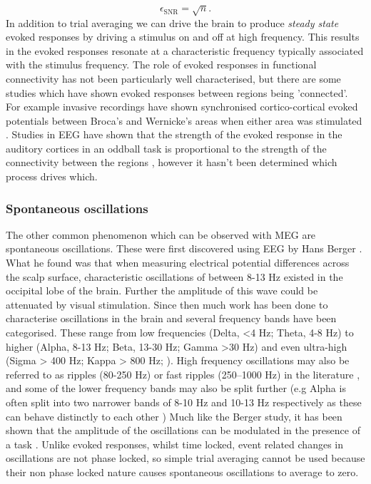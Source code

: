 \begin{equation}
\epsilon_\text{SNR} = \sqrt{n}.
\end{equation} In addition to trial averaging we can drive the brain to produce \textit{steady state} evoked responses \citep{Regan1977} by driving a stimulus on and off at high frequency. This results in the evoked responses resonate at a characteristic frequency typically associated with the stimulus frequency. The role of evoked responses in functional connectivity has not been particularly well characterised, but there are some studies which have shown evoked responses between regions being 'connected'. For example invasive recordings have shown synchronised cortico-cortical evoked potentials between Broca's and Wernicke's areas when either area was stimulated \citep{Matsumoto2004}. Studies in EEG have shown that the strength of the evoked response in the auditory cortices in an oddball task is proportional to the strength of the connectivity between the regions \citep{Kuhnis2014}, however it hasn't been determined which process drives which.  

\subsubsection{Spontaneous oscillations} 
The other common phenomenon which can be observed with MEG are spontaneous oscillations. These were first discovered using EEG by Hans Berger \citeyearpar{Berger1929}. What he found was that when measuring electrical potential differences across the scalp surface, characteristic oscillations of between 8-13 Hz existed in the occipital lobe of the brain. Further the amplitude of this wave could be attenuated by visual stimulation. Since then much work has been done to characterise oscillations in the brain and several frequency bands have been categorised. These range from low frequencies (Delta, <4 Hz; Theta, 4-8 Hz) to higher (Alpha, 8-13 Hz; Beta, 13-30 Hz; Gamma >30 Hz) and even ultra-high (Sigma > 400 Hz; Kappa > 800 Hz; \citealp{Fedele2015}). High frequency oscillations may also be referred to as ripples (80-250 Hz) or fast ripples (250–1000 Hz) in the literature \citep{Buzsaki1992,Bragin2002,Worrell2008}, and some of the lower frequency bands may also be split further (e.g Alpha is often split into two narrower bands of 8-10 Hz and 10-13 Hz respectively as these can behave distinctly to each other \citep{Bosboom2008,vanderMeer2013,Hillebrand2016}) Much like the Berger study, it has been shown that the amplitude of the oscillations can be modulated in the presence of a task \citep{Pfurtscheller1999,vanBurik1999,Singh2002}. Unlike evoked responses, whilst time locked, event related changes in oscillations are not phase locked, so simple trial averaging cannot be used because their non phase locked nature causes spontaneous oscillations to average to zero.

